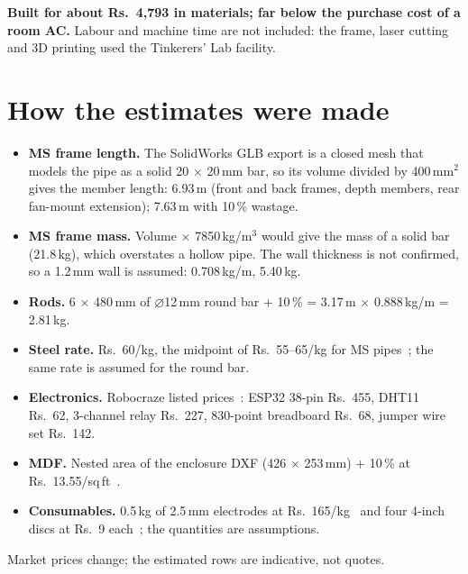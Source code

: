 \documentclass[11pt,a4paper]{report}
\begin{document}
\noindent\textbf{Built for about Rs.~4{,}793 in materials; far below the purchase cost of a room AC.} Labour and machine time are not included: the frame, laser cutting and 3D printing used the Tinkerers' Lab facility.

\section{How the estimates were made}
\begin{itemize}
\item \textbf{MS frame length.} The SolidWorks GLB export is a closed mesh that models the pipe as a solid 20 $\times$ 20\,mm bar, so its volume divided by 400\,mm$^2$ gives the member length: 6.93\,m (front and back frames, depth members, rear fan-mount extension); 7.63\,m with 10\,\% wastage.
\item \textbf{MS frame mass.} Volume $\times$ 7850\,kg/m$^3$ would give the mass of a solid bar (21.8\,kg), which overstates a hollow pipe. The wall thickness is not confirmed, so a 1.2\,mm wall is assumed: 0.708\,kg/m, 5.40\,kg.
\item \textbf{Rods.} 6 $\times$ 480\,mm of $\varnothing$12\,mm round bar + 10\,\% = 3.17\,m $\times$ 0.888\,kg/m = 2.81\,kg.
\item \textbf{Steel rate.} Rs.~60/kg, the midpoint of Rs.~55--65/kg for MS pipes~\cite{coststeel}; the same rate is assumed for the round bar.
\item \textbf{Electronics.} Robocraze listed prices~\cite{costrobo}: ESP32 38-pin Rs.~455, DHT11 Rs.~62, 3-channel relay Rs.~227, 830-point breadboard Rs.~68, jumper wire set Rs.~142.
\item \textbf{MDF.} Nested area of the enclosure DXF (426 $\times$ 253\,mm) + 10\,\% at Rs.~13.55/sq\,ft~\cite{costmdf}.
\item \textbf{Consumables.} 0.5\,kg of 2.5\,mm electrodes at Rs.~165/kg~\cite{costelec} and four 4-inch discs at Rs.~9 each~\cite{costdisc}; the quantities are assumptions.
\end{itemize}
Market prices change; the estimated rows are indicative, not quotes.

\end{document}
